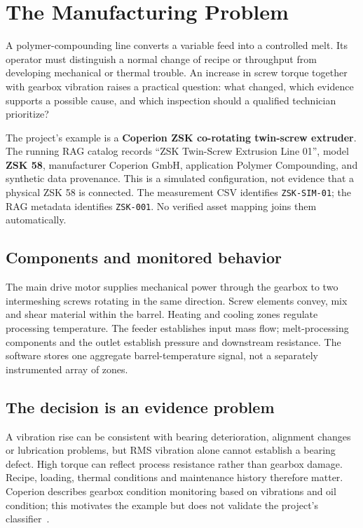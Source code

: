 \chapter{The Manufacturing Problem}
A polymer-compounding line converts a variable feed into a controlled melt. Its operator must distinguish a normal change of recipe or throughput from developing mechanical or thermal trouble. An increase in screw torque together with gearbox vibration raises a practical question: what changed, which evidence supports a possible cause, and which inspection should a qualified technician prioritize?

The project's example is a \textbf{Coperion ZSK co-rotating twin-screw extruder}. The running RAG catalog records ``ZSK Twin-Screw Extrusion Line 01'', model \textbf{ZSK 58}, manufacturer Coperion GmbH, application Polymer Compounding, and synthetic data provenance. This is a simulated configuration, not evidence that a physical ZSK 58 is connected. The measurement CSV identifies \texttt{ZSK-SIM-01}; the RAG metadata identifies \texttt{ZSK-001}. No verified asset mapping joins them automatically.
\section{Components and monitored behavior}
The main drive motor supplies mechanical power through the gearbox to two intermeshing screws rotating in the same direction. Screw elements convey, mix and shear material within the barrel. Heating and cooling zones regulate processing temperature. The feeder establishes input mass flow; melt-processing components and the outlet establish pressure and downstream resistance. The software stores one aggregate barrel-temperature signal, not a separately instrumented array of zones.
\section{The decision is an evidence problem}
A vibration rise can be consistent with bearing deterioration, alignment changes or lubrication problems, but RMS vibration alone cannot establish a bearing defect. High torque can reflect process resistance rather than gearbox damage. Recipe, loading, thermal conditions and maintenance history therefore matter. Coperion describes gearbox condition monitoring based on vibrations and oil condition; this motivates the example but does not validate the project's classifier~\cite{coperionmonitor}.
